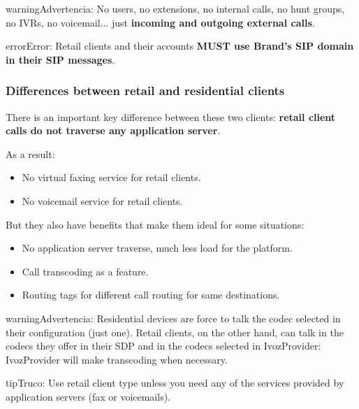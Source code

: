 \documentclass[letterpaper,10pt,spanish]{sphinxmanual}
\begin{document}
\begin{notice}{warning}{Advertencia:}
No users, no extensions, no internal calls, no hunt groups, no IVRs, no voicemail...
just \textbf{incoming and outgoing external calls}.
\end{notice}

\begin{notice}{error}{Error:}
Retail clients and their accounts \textbf{MUST use Brand's SIP domain in their SIP messages}.
\end{notice}


\subsubsection{Differences between retail and residential clients}
\label{administration_portal/brand/clients/retail:differences-between-retail-and-residential-clients}
There is an important key difference between these two clients: \textbf{retail client calls do not traverse
any application server}.

As a result:
\begin{itemize}
\item {} 
No virtual faxing service for retail clients.

\item {} 
No voicemail service for retail clients.

\end{itemize}

But they also have benefits that make them ideal for some situations:
\begin{itemize}
\item {} 
No application server traverse, much less load for the platform.

\item {} 
Call transcoding as a feature.

\item {} 
Routing tags for different call routing for same destinations.

\end{itemize}

\begin{notice}{warning}{Advertencia:}
Residential devices are force to talk the codec selected in their configuration (just one).
Retail clients, on the other hand, can talk in the codecs they offer in their SDP and in the
codecs selected in IvozProvider: IvozProvider will make transcoding when necessary.
\end{notice}

\begin{notice}{tip}{Truco:}
Use retail client type unless you need any of the services provided by application servers (fax or voicemails).
\end{notice}
\end{document}
